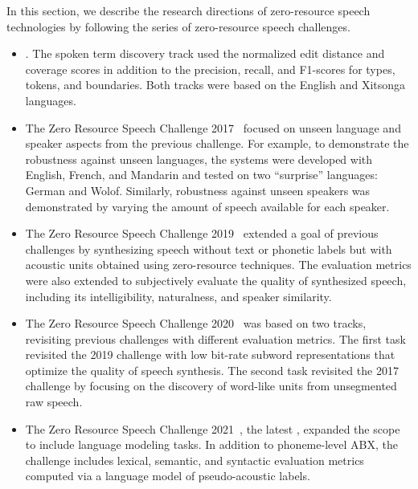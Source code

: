 In this section, we describe the research directions of zero-resource speech
technologies by following the series of zero-resource speech challenges.
\begin{itemize}
	 \item {}.
	 The spoken term discovery track used the normalized edit distance and coverage
	 scores in addition to the precision, recall, and F1-scores for types,
	 tokens, and boundaries.
    Both tracks were based on the English and Xitsonga languages.
	 \item The Zero Resource Speech Challenge 2017~\parencite{dunbar_zero_2017} focused on 
	 unseen language and speaker aspects from the previous challenge. For
	 example, to demonstrate the robustness against unseen languages, the systems
	 were developed with English, French, and Mandarin and tested on
	 two ``surprise'' languages: German and Wolof.
	 Similarly, robustness against unseen speakers was demonstrated by varying
	 the amount of speech available for each speaker.
	 \item The Zero Resource Speech Challenge 2019~\parencite{dunbar_zero_2019} extended a goal of
	 previous challenges by synthesizing speech without
	 text or phonetic labels but with acoustic units obtained using
	 zero-resource techniques.
	 The evaluation metrics were also extended to subjectively evaluate the
	 quality of synthesized speech, including its intelligibility, naturalness,
	 and speaker similarity.
	 \item The Zero Resource Speech Challenge 2020~\parencite{dunbar_zero_2020} was based on two
	 tracks, revisiting previous challenges with different evaluation metrics. 
	 The first task revisited the 2019 challenge with low bit-rate subword
	 representations that optimize the quality of speech synthesis. The second
	 task revisited the 2017 challenge by focusing on the discovery of word-like
	 units from unsegmented raw speech.
	 \item The Zero Resource Speech Challenge 2021~\parencite{nguyen_zero_2020}, the latest
	 , expanded the scope to include language modeling tasks.
	 In addition to phoneme-level ABX, the challenge includes lexical,
	 semantic, and syntactic evaluation metrics computed via a language model of
	 pseudo-acoustic labels.
\end{itemize}
